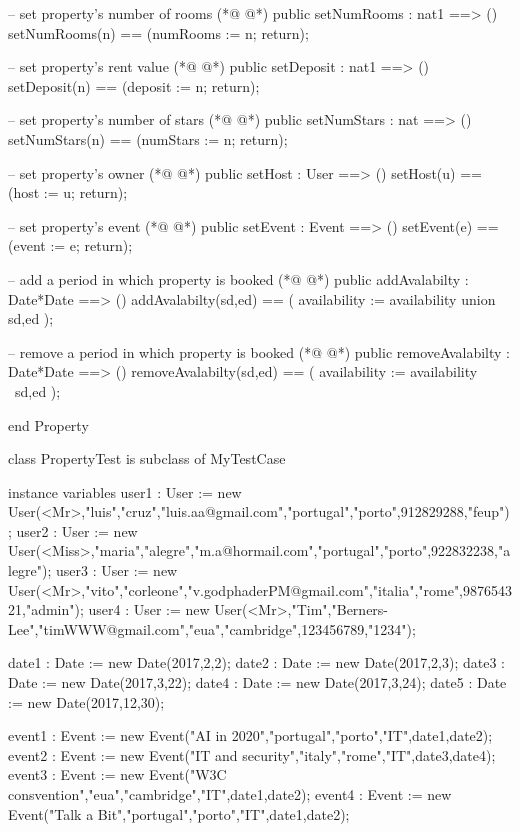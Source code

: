 \begin{vdmpp}[breaklines=true]
 -- set property's number of rooms
(*@
\label{setNumRooms:75}
@*)
 public setNumRooms : nat1 ==> ()
  setNumRooms(n) == (numRooms := n; return);
  
 -- set property's rent value
(*@
\label{setDeposit:79}
@*)
 public setDeposit : nat1 ==> ()
  setDeposit(n) == (deposit := n; return);
 
 -- set property's number of stars
(*@
\label{setNumStars:83}
@*)
 public setNumStars : nat ==> ()
  setNumStars(n) == (numStars := n; return);
  
 -- set property's owner
(*@
\label{setHost:87}
@*)
 public setHost : User ==> ()
  setHost(u) == (host := u; return);
  
 -- set property's event
(*@
\label{setEvent:91}
@*)
 public setEvent : Event ==> ()
  setEvent(e) == (event := e; return);

 -- add a period in which property is booked
(*@
\label{addAvalabilty:95}
@*)
 public addAvalabilty : Date*Date ==> ()
  addAvalabilty(sd,ed) == 
  (
   availability := availability union {sd,ed}
  );
  
 -- remove a period in which property is booked
(*@
\label{removeAvalabilty:102}
@*)
 public removeAvalabilty : Date*Date ==> ()
  removeAvalabilty(sd,ed) == 
  (
   availability := availability \ {sd,ed}
  );

end Property

class PropertyTest is subclass of MyTestCase

instance variables
 user1 : User := new User(<Mr>,"luis","cruz","luis.aa@gmail.com","portugal","porto",912829288,"feup");
 user2 : User := new User(<Miss>,"maria","alegre","m.a@hormail.com","portugal","porto",922832238,"alegre");
 user3 : User := new User(<Mr>,"vito","corleone","v.godphaderPM@gmail.com","italia","rome",987654321,"admin");
 user4 : User := new User(<Mr>,"Tim","Berners-Lee","timWWW@gmail.com","eua","cambridge",123456789,"1234");
 
 date1 : Date := new Date(2017,2,2);
 date2 : Date := new Date(2017,2,3);
 date3 : Date := new Date(2017,3,22);
 date4 : Date := new Date(2017,3,24);
 date5 : Date := new Date(2017,12,30);
 
 event1 : Event := new Event("AI in 2020","portugal","porto","IT",date1,date2);
 event2 : Event := new Event("IT and security","italy","rome","IT",date3,date4);
 event3 : Event := new Event("W3C consvention","eua","cambridge","IT",date1,date2);
 event4 : Event := new Event("Talk a Bit","portugal","porto","IT",date1,date2);
 

\end{vdmpp}
